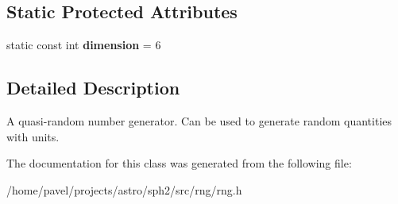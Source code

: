 \subsection*{Static Protected Attributes}
\begin{DoxyCompactItemize}
\item 
\hypertarget{classHaltonQrng_a9e1933d474c59dab416349fa32d9deb6}{}\label{classHaltonQrng_a9e1933d474c59dab416349fa32d9deb6} 
static const int {\bfseries dimension} = 6
\end{DoxyCompactItemize}


\subsection{Detailed Description}
A quasi-\/random number generator. Can be used to generate random quantities with units. 

The documentation for this class was generated from the following file\+:\begin{DoxyCompactItemize}
\item 
/home/pavel/projects/astro/sph2/src/rng/rng.\+h\end{DoxyCompactItemize}
